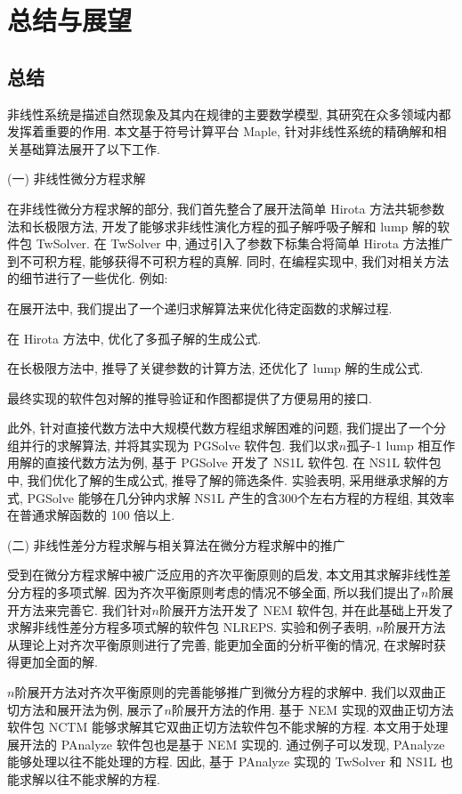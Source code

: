 \chapter{总结与展望}\label{ch07}
\section{总结}
非线性系统是描述自然现象及其内在规律的主要数学模型, 其研究在众多领域内都发挥着重要的作用. 本文基于符号计算平台 Maple, 针对非线性系统的精确解和相关基础算法展开了以下工作.

(一) 非线性微分方程求解

在非线性微分方程求解的部分, 我们首先整合了\Painleve{}展开法\D 简单 Hirota 方法\D 共轭参数法和长极限方法, 开发了能够求非线性演化方程的孤子解\D 呼吸子解和 lump 解的软件包 TwSolver. 在 TwSolver 中, 通过引入了参数下标集合将简单 Hirota 方法推广到不可积方程, 能够获得不可积方程的真解. 同时, 在编程实现中, 我们对相关方法的细节进行了一些优化. 例如:
\begin{compactenum}[(1)]
\item 在\Painleve{}展开法中, 我们提出了一个递归求解算法来优化待定函数的求解过程.
\item 在 Hirota 方法中, 优化了多孤子解的生成公式.
\item 在长极限方法中, 推导了关键参数的计算方法, 还优化了 lump 解的生成公式.
\item 最终实现的软件包对解的推导\D 验证和作图都提供了方便易用的接口. 
\end{compactenum}

此外, 针对直接代数方法中大规模代数方程组求解困难的问题, 我们提出了一个分组并行的求解算法, 并将其实现为 PGSolve 软件包. 我们以求$n$孤子-1 lump 相互作用解的直接代数方法为例, 基于 PGSolve 开发了 NS1L 软件包. 在 NS1L 软件包中, 我们优化了解的生成公式, 推导了解的筛选条件. 实验表明, 采用继承求解的方式, PGSolve 能够在几分钟内求解 NS1L 产生的含300个左右方程的方程组, 其效率在普通求解函数的 100 倍以上.  

(二) 非线性差分方程求解与相关算法在微分方程求解中的推广

受到在微分方程求解中被广泛应用的齐次平衡原则的启发, 本文用其求解非线性差分方程的多项式解. 因为齐次平衡原则考虑的情况不够全面, 所以我们提出了$n$阶展开方法来完善它. 我们针对$n$阶展开方法开发了 NEM 软件包, 并在此基础上开发了求解非线性差分方程多项式解的软件包 NLREPS. 实验和例子表明, $n$阶展开方法从理论上对齐次平衡原则进行了完善, 能更加全面的分析平衡的情况, 在求解时获得更加全面的解. 

$n$阶展开方法对齐次平衡原则的完善能够推广到微分方程的求解中. 我们以双曲正切方法和\Painleve{}展开法为例, 展示了$n$阶展开方法的作用. 基于 NEM 实现的双曲正切方法软件包 NCTM 能够求解其它双曲正切方法软件包不能求解的方程. 本文用于处理\Painleve{}展开法的 PAnalyze 软件包也是基于 NEM 实现的. 通过例子可以发现, PAnalyze 能够处理以往不能处理的方程. 因此, 基于 PAnalyze 实现的 TwSolver 和 NS1L 也能求解以往不能求解的方程. 

